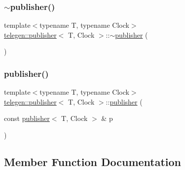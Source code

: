 \mbox{\label{classtelegen_1_1publisher_a075945686aca7ef00a37783cc5079caf}} 
\subsubsection{\texorpdfstring{$\sim$publisher()}{~publisher()}}
{\footnotesize\ttfamily template$<$typename T, typename Clock$>$ \\
\hyperlink{classtelegen_1_1publisher}{telegen\+::publisher}$<$ T, Clock $>$\+::$\sim$\hyperlink{classtelegen_1_1publisher}{publisher} (\begin{DoxyParamCaption}{ }\end{DoxyParamCaption})\hspace{0.3cm}{\ttfamily [inline]}}

\mbox{\label{classtelegen_1_1publisher_a8b7695fbea0b0ebb4e850eb1cc1a9fd5}} 
\subsubsection{\texorpdfstring{publisher()}{publisher()}\hspace{0.1cm}{\footnotesize\ttfamily [3/3]}}
{\footnotesize\ttfamily template$<$typename T, typename Clock$>$ \\
\hyperlink{classtelegen_1_1publisher}{telegen\+::publisher}$<$ T, Clock $>$\+::\hyperlink{classtelegen_1_1publisher}{publisher} (\begin{DoxyParamCaption}\item[{const \hyperlink{classtelegen_1_1publisher}{publisher}$<$ T, Clock $>$ \&}]{p }\end{DoxyParamCaption})\hspace{0.3cm}{\ttfamily [delete]}}



\subsection{Member Function Documentation}
\mbox{\label{classtelegen_1_1publisher_a3b5f514d064a6bca0209753dd724a2a7}} 
